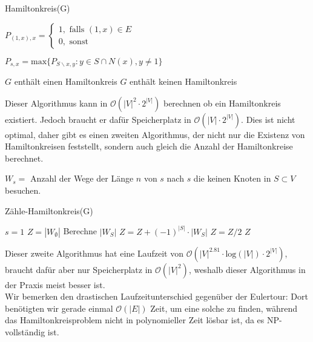\begin{algorithm}
    \caption{Hamiltonkreis(G)}
    \begin{algorithmic}[1]
         
            \State $P_{(1,x), x} =
            \begin{cases}
                1, \text{ falls }(1,x) \in E\\
                0, \text{ sonst }
            \end{cases} $
        \EndFor

         
                    \State $P_{s,x} = \text{max} \{ P_{S \backslash {x}, y}: y \in S \cap N(x), y \neq 1 \} $
                \EndFor
            \EndFor
        \EndFor

         
            \State \Return $G$ enthält einen Hamiltonkreis
        \Else
            \State \Return $G$ enthält keinen Hamiltonkreis
        \EndIf
    \end{algorithmic}
\end{algorithm}

Dieser Algorithmus kann in $\mathcal{O}(|V|^2 \cdot 2^{|V|})$ berechnen ob ein Hamiltonkreis existiert. Jedoch braucht
er dafür Speicherplatz in $\mathcal{O}(|V| \cdot 2^{|V|})$. Dies ist nicht optimal, daher gibt es einen zweiten Algorithmus,
der nicht nur die Existenz von Hamiltonkreisen feststellt, sondern auch gleich die Anzahl der Hamiltonkreise berechnet.

\begin{definition}
    $W_s = $ Anzahl der Wege der Länge $n$ von $s$ nach $s$ die keinen Knoten in $S \subset V$ besuchen. 
\end{definition}

\begin{algorithm}
    \caption{Zähle-Hamiltonkreis(G)}
    \begin{algorithmic}[1]
        \State $s = 1$ 
        \State $Z = |W_\emptyset|$
        \For{}
            \State Berechne $|W_S|$ 
            \State $Z = Z + (-1)^{|S|} \cdot |W_S|$
        \EndFor
        \State $Z = Z / 2$
        \State \Return $Z$ 
    \end{algorithmic}
\end{algorithm}

Dieser zweite Algorithmus hat eine Laufzeit von $\mathcal{O}(|V|^{2.81} \cdot \text{log}(|V|) \cdot 2^{|V|})$, braucht
dafür aber nur Speicherplatz in $\mathcal{O}(|V|^2)$, weshalb dieser Algorithmus in der Praxis meist besser ist. \\

Wir bemerken den drastischen Laufzeitunterschied gegenüber der Eulertour: Dort benötigten wir gerade 
einmal $\mathcal{O}(|E|)$ Zeit, um eine solche zu finden, während das Hamiltonkreisproblem nicht in polynomieller Zeit lösbar ist, da es 
NP-vollständig ist.